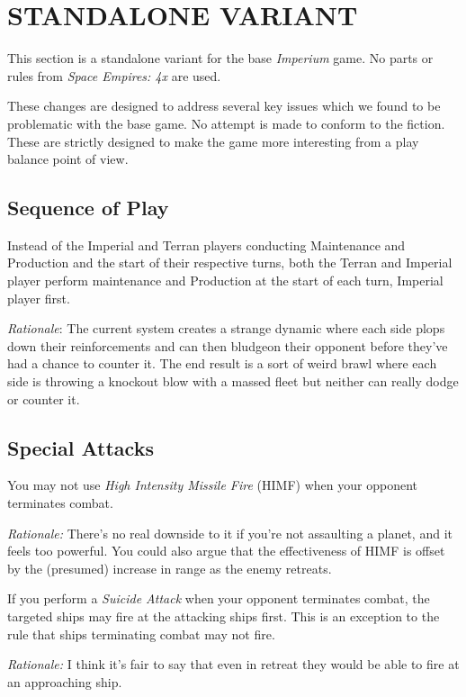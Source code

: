 \section{STANDALONE VARIANT}
\hfill

This section is a standalone variant for the base \textit{Imperium} game. No parts or rules from \textit{Space Empires: 4x} are used.

These changes are designed to address several key issues which we found to be problematic with the base game. No attempt is made to conform to the fiction. These are strictly designed to make the game more interesting from a play balance point of view.

\subsection{Sequence of Play}

Instead of the Imperial and Terran players conducting Maintenance and Production and the start of their respective turns, both the Terran and Imperial player perform maintenance and Production at the start of each turn, Imperial player first.
\hfill

\textit{Rationale}: The current system creates a strange dynamic where each side plops down their reinforcements and can then bludgeon their opponent before they've had a chance to counter it. The end result is a sort of weird brawl where each side is throwing a knockout blow with a massed fleet but neither can really dodge or counter it.

\subsection{Special Attacks}

You may not use \textit{High Intensity Missile Fire} (HIMF) when your opponent terminates combat.

\textit{Rationale:} There's no real downside to it if you're not assaulting a planet, and it feels too powerful. You could also argue that the effectiveness of HIMF is offset by the (presumed) increase in range as the enemy retreats.

If you perform a \textit{Suicide Attack} when your opponent terminates combat, the targeted ships may fire at the attacking ships first. This is an exception to the rule that ships terminating combat may not fire.

\textit{Rationale:} I think it's fair to say that even in retreat they would be able to fire at an approaching ship.

